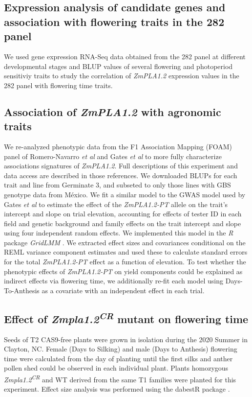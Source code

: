 \documentclass[9pt,twocolumn,twoside,lineno]{BioRxiv}
\begin{document}
\subsection{Expression analysis of candidate genes and association with flowering traits in the 282 panel}
We used gene expression RNA-Seq data obtained from the 282 panel at different developmental stages \cite{Kremling2018-gn} and BLUP values of several flowering and photoperiod sensitiviy traits \cite{Hung2012-ms} to study the correlation of \textit{ZmPLA1.2} expression values in the 282 panel with flowering time traits.  

\subsection{Association of \textit{ZmPLA1.2} with agronomic traits}
We re-analyzed phenotypic data from the F1 Association Mapping (FOAM) panel of Romero-Navarro \textit{et al} \cite{Romero_Navarro2017-cn} and Gates \textit{et al} \cite{Gates2019-xu} to more fully characterize associations signatures of \textit{ZmPLA1.2}. 
Full descriptions of this experiment and data access are described in those references. 
We downloaded BLUPs for each trait and line from Germinate 3, and subseted to only those lines with GBS genotype data from México. 
We fit a similar model to the GWAS model used by Gates \textit{et al} \cite{Gates2019-xu} to estimate the effect of the \textit{ZmPLA1.2-PT} allele on the trait's intercept and slope on trial elevation, accounting for effects of tester ID in each field and genetic background and family effects on the trait intercept and slope using four independent random effects. 
We implemented this model in the \textit{R} package \textit{GridLMM} \cite{Runcie2019-Gr}. 
We extracted effect sizes and covariances conditional on the REML variance component estimates and used these to calculate standard errors for the total \textit{ZmPLA1.2-PT} effect as a function of elevation. 
To test whether the phenotypic effects of \textit{ZmPLA1.2-PT} on yield components could be explained as indirect effects via flowering time, we additionally re-fit each model using Days-To-Anthesis as a covariate with an independent effect in each trial.

\subsection{Effect of \textit{Zmpla1.2\textsuperscript{CR}} mutant on flowering time}
Seeds of T2 CAS9-free plants were grown in isolation during the 2020 Summer in Clayton, NC. Female (Days to Silking) and male (Days to Anthesis) flowering time were calculated from the day of planting until the first silks and anther pollen shed could be observed in each individual plant. 
Plants homozygous \textit{Zmpla1.2\textsuperscript{CR}} and WT derived from the same T1 families were planted for this experiment. 
Effect size analysis was performed using the dabestR package \cite{Ho2019-yl}.
\end{document}
